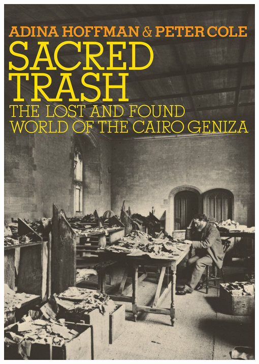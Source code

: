 \documentclass{tufte-handout}
\makeatletter
\newcommand{\varcaption}[2][0pt]{%
  \gsetlength{\@tufte@caption@vertical@offset}{-#1}%
  \gdef\@tufte@stored@varcaption{#2}%
}
\gdef\@tufte@stored@varcaption{} %
\makeatother
\begin{document}
\begin{marginfigure}[-35\baselineskip]
   \includegraphics[width=\linewidth]{images/sacred_trash.jpg}
   \varcaption{\href{https://www.penguinrandomhouse.com/books/81238/sacred-trash-by-adina-hoffman-and-peter-cole/}{Publisher Link}, \href{https://www.amazon.com/Sacred-Trash-Geniza-Jewish-Encounters/dp/080521223X/}{Amazon Link}}
\end{marginfigure}
\end{document}
